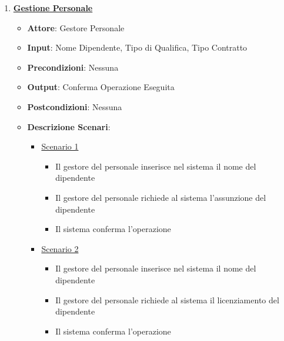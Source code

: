 \begin{enumerate}
    \item \uline {{\bf Gestione Personale}}
    \begin{itemize} 
        \item {\bf Attore}: Gestore Personale
        \item {\bf Input}: Nome Dipendente, Tipo di Qualifica, Tipo Contratto
        \item {\bf Precondizioni}: Nessuna
        \item {\bf Output}: Conferma Operazione Eseguita
        \item {\bf Postcondizioni}: Nessuna
        \item {\bf Descrizione Scenari}:
        \begin{itemize}
            \item \uline{Scenario 1}
            \begin{itemize}
                \item Il gestore del personale inserisce nel sistema il nome del dipendente
                \item Il gestore del personale richiede al sistema l'assunzione del dipendente
                \item Il sistema conferma l'operazione
            \end{itemize}
            \item \uline{Scenario 2}
            \begin{itemize}
                \item Il gestore del personale inserisce nel sistema il nome del dipendente
                \item Il gestore del personale richiede al sistema il licenziamento del dipendente
                \item Il sistema conferma l'operazione
            \end{itemize}
        \end{itemize}     
    \end{itemize}


\end{enumerate}
